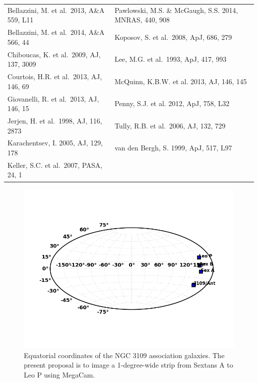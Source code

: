 \begin{table}[h]
\begin{tabular}{ll}
Bellazzini, M. et al.\  2013, A\&A 559, L11 & Pawlowski, M.S. \&  McGaugh, S.S. 2014, MNRAS, 440, 908\\
Bellazzini, M. et al.\  2014, A\&A 566, 44 & Koposov, S. et al.\ 2008, ApJ, 686, 279\\
Chiboucas, K. et al.\  2009, AJ, 137, 3009 & Lee, M.G. et al.\ 1993, ApJ, 417, 993\\
Courtois, H.R. et al.\ 2013, AJ, 146, 69 &  McQuinn, K.B.W. et al. 2013, AJ, 146, 145\\
Giovanelli, R. et al.\ 2013, AJ, 146, 15 & Penny, S.J. et al. 2012, ApJ, 758, L32\\
Jerjen, H. et al.\ 1998, AJ, 116, 2873  &  Tully, R.B. et al.\ 2006, AJ, 132, 729\\
Karachentsev, I. 2005, AJ, 129, 178 &van den Bergh, S. 1999, ApJ, 517, L97\\
Keller, S.C. et al.\ 2007, PASA, 24, 1\\
\end{tabular}
\end{table}



\begin{figure}
\caption{Equatorial coordinates of the NGC 3109 association galaxies. The present proposal is to image
a 1-degree-wide strip from Sextans A to Leo P using MegaCam.}
\includegraphics[scale=0.7]{n3109_group_sky}

\end{figure}


